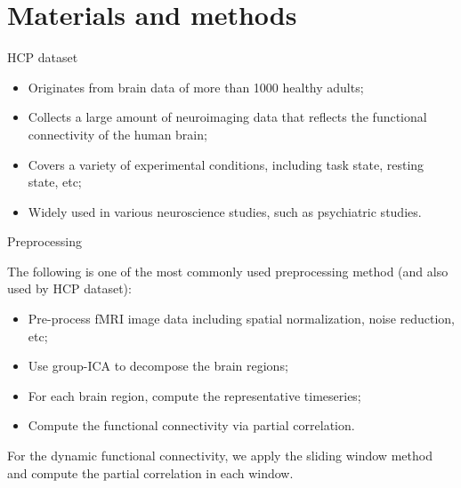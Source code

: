 \documentclass{beamer}
\begin{document}
\section{Materials and methods}

\begin{frame}{HCP dataset}

    \begin{itemize}
        \item Originates from brain data of more than 1000 healthy adults;
        \item Collects a large amount of neuroimaging data that reflects the functional connectivity of the human brain;
        \item Covers a variety of experimental conditions, including task state, resting state, etc;
        \item Widely used in various neuroscience studies, such as psychiatric studies.
    \end{itemize}

\end{frame}

\begin{frame}{Preprocessing}

    The following is one of the most commonly used preprocessing method (and also used by HCP dataset):

    \begin{itemize}
        \item Pre-process fMRI image data including spatial normalization, noise reduction, etc;
        \item Use group-ICA to decompose the brain regions;
        \item For each brain region, compute the representative timeseries;
        \item Compute the functional connectivity via partial correlation.
    \end{itemize}

    For the dynamic functional connectivity, we apply the sliding window method and compute the partial correlation in each window.

\end{frame}

\end{document}
